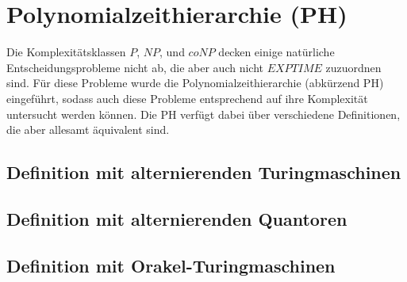 \chapter{Polynomialzeithierarchie (PH)} \label{chapter: Polynomialzeithierarchie (PH)}
Die Komplexitätsklassen $P$, $NP$, und $coNP$ decken einige natürliche Entscheidungsprobleme nicht ab, die aber auch 
nicht $EXPTIME$ zuzuordnen sind. Für diese Probleme wurde die Polynomialzeithierarchie (abkürzend PH) eingeführt, sodass 
auch diese Probleme entsprechend auf ihre Komplexität untersucht werden können.
Die PH verfügt dabei über verschiedene Definitionen, die aber allesamt äquivalent sind.


\section{Definition mit alternierenden Turingmaschinen} \label{section: Definition PH mit ATM}

\section{Definition mit alternierenden Quantoren} \label{section: Definition PH mit alternierenden Quantoren}

\section{Definition mit Orakel-Turingmaschinen} \label{section: Definition PH mit Orakel-Turingmaschinen}